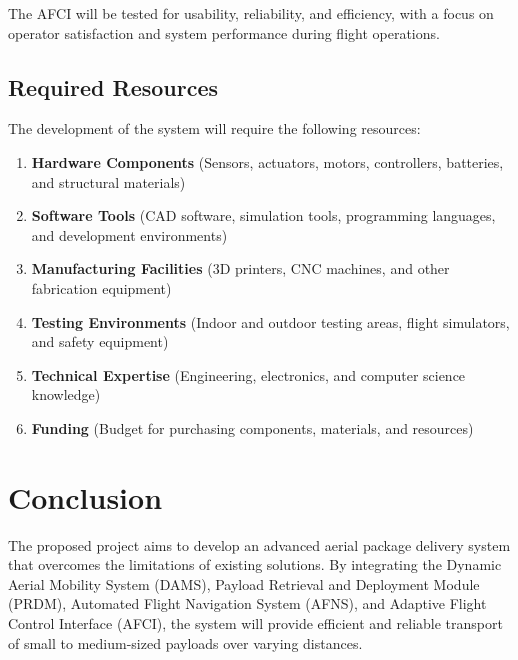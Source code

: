 \documentclass[12pt]{article}
\begin{document}
The AFCI will be tested for usability, reliability, and efficiency, with a focus on operator satisfaction and system performance during flight operations.

\subsection{Required Resources}
The development of the system will require the following resources:
\begin{enumerate}
    \item \textbf{Hardware Components} (Sensors, actuators, motors, controllers, batteries, and structural materials)
    \item \textbf{Software Tools} (CAD software, simulation tools, programming languages, and development environments)
    \item \textbf{Manufacturing Facilities} (3D printers, CNC machines, and other fabrication equipment)
    \item \textbf{Testing Environments} (Indoor and outdoor testing areas, flight simulators, and safety equipment)
    \item \textbf{Technical Expertise} (Engineering, electronics, and computer science knowledge)
    \item \textbf{Funding} (Budget for purchasing components, materials, and resources)
\end{enumerate}

\section{Conclusion}
The proposed project aims to develop an advanced aerial package delivery system that overcomes the limitations of existing solutions. By integrating the Dynamic Aerial Mobility System (DAMS), Payload Retrieval and Deployment Module (PRDM), Automated Flight Navigation System (AFNS), and Adaptive Flight Control Interface (AFCI), the system will provide efficient and reliable transport of small to medium-sized payloads over varying distances.
\end{document}
